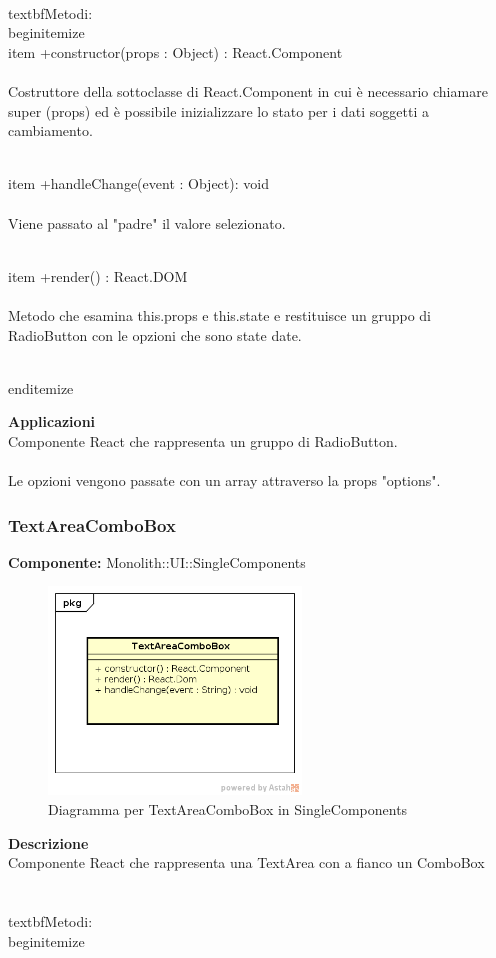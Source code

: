 \\textbf{Metodi:} 
\\begin{itemize}
\\item +constructor(props : Object) : React.Component 
\\\\
Costruttore della sottoclasse di React.Component in cui è necessario chiamare super (props) ed è possibile inizializzare lo stato per i dati soggetti a cambiamento.

\\item +handleChange(event : Object): void 
\\\\
Viene passato al "padre" il valore selezionato.

\\item +render() : React.DOM 
\\\\
Metodo che esamina this.props e this.state e restituisce un gruppo di RadioButton con le opzioni che sono state date.

\\end{itemize} 


\textbf{Applicazioni}\\
Componente React che rappresenta un gruppo di RadioButton. \\\\ Le opzioni vengono passate con un array attraverso la props "options". 


\clearpage

\subsubsection{TextAreaComboBox}
\textbf{Componente:}  Monolith::UI::SingleComponents\\
   \FloatBarrier
   \begin{figure}[ht]
   \centering
   \includegraphics[width=0.6\textwidth]{img/single-TextAreaComboBox}
   \caption{{Diagramma per TextAreaComboBox in SingleComponents}}
\end{figure}
\FloatBarrier
\textbf{Descrizione}\\
Componente React che rappresenta una TextArea con a fianco un ComboBox \\\\
\\textbf{Metodi:} 
\\begin{itemize}


